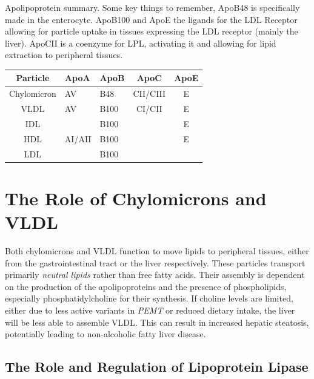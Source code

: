 \documentclass{tufte-handout}
\begin{document}
\begin{margintable}
\centering
\caption{Apolipoprotein summary.  Some key things to remember, ApoB48 is specifically made in the enterocyte.  ApoB100 and ApoE the ligands for the LDL Receptor allowing for particle uptake in tissues expressing the LDL receptor (mainly the liver).  ApoCII is a coenzyme for LPL, activating it and allowing for lipid extraction to peripheral tissues.}
\label{tab:apolipoproteins}
\begin{tabular}{@{}cllcc@{}}
\toprule
\textbf{Particle} & \textbf{ApoA} & \textbf{ApoB} & \textbf{ApoC} & \textbf{ApoE} \\ \midrule
Chylomicron       &  AV         & B48           & CII/CIII           & E             \\
VLDL              &   AV            & B100          & CI/CII        & E             \\
IDL               &                  & B100         &        &   E \\
HDL               & AI/AII          & B100          &               &             E  \\
LDL               &         & B100          &               &              
\end{tabular}
\end{margintable}
\section{The Role of Chylomicrons and VLDL}

Both chylomicrons and VLDL function to move lipids to peripheral tissues, either from the gastrointestinal tract or the liver respectively.  These particles transport primarily \emph{neutral lipids} rather than free fatty acids.  Their assembly is dependent on the production of the apolipoproteins and the presence of phospholipids, especially phosphatidylcholine for their synthesis.   If choline levels are limited, either due to less active variants in \textit{PEMT} or reduced dietary intake, the liver will be less able to assemble VLDL.  This can result in increased hepatic steatosis, potentially leading to non-alcoholic fatty liver disease.

\subsection{The Role and Regulation of Lipoprotein Lipase}
\end{document}
